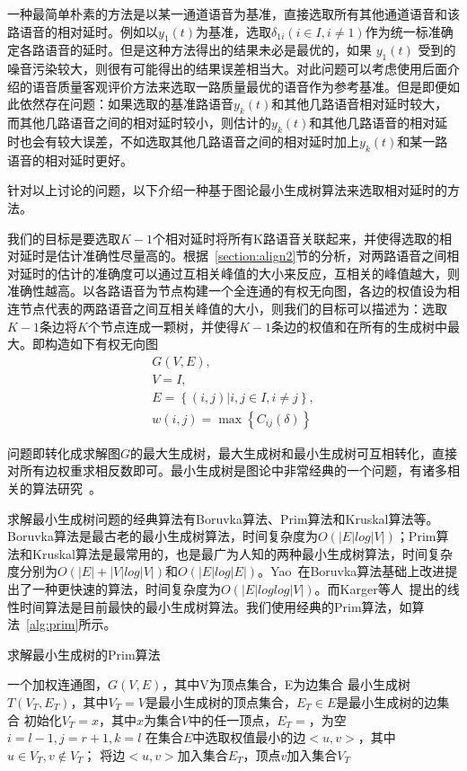 一种最简单朴素的方法是以某一通道语音为基准，直接选取所有其他通道语音和该路语音的相对延时。例如以$y_1 (t)$为基准，选取$\delta_{1i}  (i \in I, i \neq 1)$作为统一标准确定各路语音的延时。但是这种方法得出的结果未必是最优的，如果 $y_1 (t)$ 受到的噪音污染较大，则很有可能得出的结果误差相当大。对此问题可以考虑使用后面介绍的语音质量客观评价方法来选取一路质量最优的语音作为参考基准。但是即便如此依然存在问题：如果选取的基准路语音$y_k (t)$和其他几路语音相对延时较大，而其他几路语音之间的相对延时较小，则估计的$y_k (t)$和其他几路语音的相对延时也会有较大误差，不如选取其他几路语音之间的相对延时加上$y_k (t)$和某一路语音的相对延时更好。

针对以上讨论的问题，以下介绍一种基于图论最小生成树算法来选取相对延时的方法。

我们的目标是要选取$K-1$个相对延时将所有K路语音关联起来，并使得选取的相对延时是估计准确性尽量高的。根据~\ref{section:align2}节的分析，对两路语音之间相对延时的估计的准确度可以通过互相关峰值的大小来反应，互相关的峰值越大，则准确性越高。以各路语音为节点构建一个全连通的有权无向图，各边的权值设为相连节点代表的两路语音之间互相关峰值的大小，则我们的目标可以描述为：选取$K-1$条边将$K$个节点连成一颗树，并使得$K-1$条边的权值和在所有的生成树中最大。即构造如下有权无向图
\begin{equation}
\begin{array}{l}
G(V,E), \\
V = I, \\
E = \left\{(i,j)|i, j\in I, i \neq j\right\}, \\
w(i,j)=\max⁡ \left\{ C_{ij}(\delta) \right\}
\end{array}
\end{equation}

问题即转化成求解图$G$的最大生成树，最大生成树和最小生成树可互相转化，直接对所有边权重求相反数即可。最小生成树是图论中非常经典的一个问题，有诸多相关的算法研究~\cite{bazlamaccci2001minimum}。

求解最小生成树问题的经典算法有Boruvka算法、Prim算法和Kruskal算法等。Boruvka算法是最古老的最小生成树算法，时间复杂度为$O(|E|log|V|)$；Prim算法和Kruskal算法是最常用的，也是最广为人知的两种最小生成树算法，时间复杂度分别为$O(|E|+|V|log|V|)$和$O(|E|log|E|)$。Yao~\cite{yao19750}在Boruvka算法基础上改进提出了一种更快速的算法，时间复杂度为$O(|E|loglog|V|)$。而Karger等人~\cite{karger1995randomized}提出的线性时间算法是目前最快的最小生成树算法。我们使用经典的Prim算法，如算法~\ref{alg:prim}所示。

\begin{algorithm}
    \caption{求解最小生成树的Prim算法}
    \label{alg:prim}
\begin{algorithmic}[1]
\INPUT
    \Statex 一个加权连通图，$G(V, E)$，其中V为顶点集合，E为边集合
\OUTPUT
    \Statex 最小生成树$T(V_T, E_T)$，其中$V_T = V$是最小生成树的顶点集合，$E_T \in E$是最小生成树的边集合
\State 初始化$V_T = {x}$，其中$x$为集合$V$中的任一顶点，$E_T = {}$，为空
\State $i=l-1, j=r+1, k=l$
    \State 在集合$E$中选取权值最小的边$<u, v>$，其中$u \in V_T, v \not\in V_T$；
    \State 将边$<u, v>$加入集合$E_T$，顶点$v$加入集合$V_T$
\EndWhile
\end{algorithmic}
\end{algorithm}

